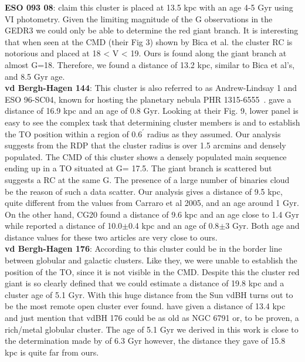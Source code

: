 \documentclass[draft]{aa}
\begin{document}
  \textbf{ESO 093 08}: \cite{Bica_1999} claim this cluster is placed at 13.5 kpc with an age
  4-5 Gyr using VI photometry. Given the limiting magnitude of the G
  observations in the GEDR3 we could only be able to determine the red giant
  branch. It is interesting that when seen at the CMD (their Fig 3) shown by
  Bica et al.  the cluster RC is notorious and placed at 18 < V < 19. Ours is found
  along the giant branch at almost G=18. Therefore, we found a distance of
  13.2 kpc, similar to Bica et al's, and 8.5 Gyr age. \\

  \textbf{vd Bergh-Hagen 144}: This cluster is also referred to as
  Andrew-Lindsay 1 and ESO 96-SC04, known for hosting the planetary nebula PHR
  1315-6555~\citep{Parker_2011}.
  \cite{Carraro_2005_neglected} gave a distance of 16.9 kpc and an age of
  0.8 Gyr. Looking at their Fig. 9, lower panel is easy to see the complex task
  that determining cluster members is and to establish the TO position within a
  region of $0.6^{\prime}$ radius as they assumed.  Our analysis suggests from the
  RDP that the cluster radius is over 1.5 arcmins and densely populated. The
  CMD of this cluster shows a densely populated main sequence ending up in a TO
  situated at G= 17.5. The giant branch is scattered but suggests a RC at the
  same G.  The presence of a large number of binaries cloud be the reason of
  such a data scatter. Our analysis gives a distance of 9.5 kpc, quite different
  from the values from Carraro et al 2005, and an age around 1 Gyr.
  On the other hand, CG20 found a distance of 9.6 kpc and an age close to 1.4
  Gyr while \cite{Majaess_2014} reported a distance of 10.0$\pm$0.4 kpc and an
  age of 0.8$\pm$3 Gyr. Both age and distance values for these two articles are
  very close to ours.\\

  \textbf{vd Bergh-Hagen 176}: According to \cite{Ortolani_1995} this cluster
  could be in the border line between globular and galactic clusters. Like
  they, we were unable to establish the position of the TO, since it is not visible
  in the CMD. Despite this the cluster red giant is so clearly defined that we
  could estimate a distance of 19.8 kpc and a cluster age of 5.1 Gyr. With this huge 
  distance from the Sun vdBH turns out to be the most remote open cluster ever found.
  \cite{Ortolani_1995} have given a distance of 13.4 kpc and just mention
  that vdBH 176 could be as old as NGC 6791 or, to be proven, a rich/metal
  globular cluster. The age of 5.1 Gyr we derived in this work is close
  to the determination made by \cite{Frinchaboy_2006} of 6.3 Gyr however,
  the distance they gave of 15.8 kpc is quite far from ours.\\
\end{document}

